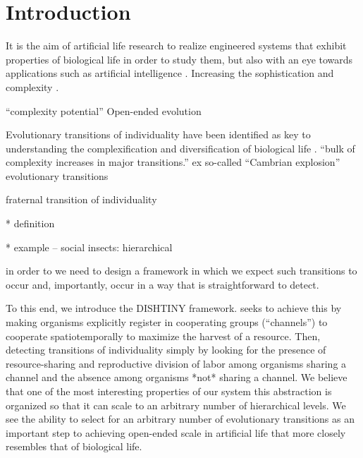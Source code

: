 \section{Introduction}

It is the aim of artificial life research to realize engineered systems that exhibit properties of biological life in order to study them, but also with an eye towards applications such as artificial intelligence \citep{bedau2003artificial}.
Increasing the sophistication and complexity \citep{goldsby2017increasing}.

``complexity potential''
Open-ended evolution \citep{taylor2016open}


\citep{ray1996evolving}

Evolutionary transitions of individuality have been identified as key to understanding the complexification and diversification of biological life \citep{smith1997major}.
``bulk of complexity increases in major transitions.''
ex so-called ``Cambrian explosion''
evolutionary transitions
\citep{west2015major}


fraternal transition of individuality

* definition

* example -- social insects: hierarchical

in order to we need to design a framework in which we expect such transitions to occur and, importantly, occur in a way that is straightforward to detect.

To this end, we introduce the DISHTINY framework.
seeks to achieve this by making organisms explicitly register in cooperating groups (``channels'') to cooperate spatiotemporally to maximize the harvest of a resource.
Then, detecting transitions of individuality simply by looking for the presence of resource-sharing and reproductive division of labor among organisms sharing a channel and the absence among organisms *not* sharing a channel.
We believe that one of the most interesting properties of our system this abstraction is organized so that it can scale to an arbitrary number of hierarchical levels.
We see the ability to select for an arbitrary number of evolutionary transitions as an important step to achieving open-ended scale in artificial life that more closely resembles that of biological life.
